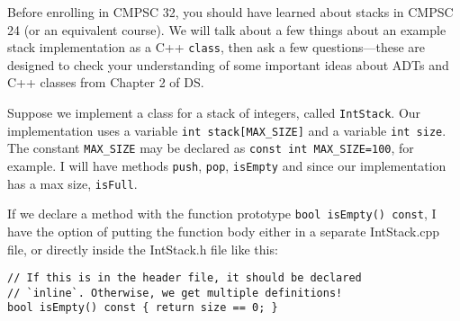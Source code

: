 \documentclass[11pt]{article}
\begin{document}
Before enrolling in CMPSC 32, you should have learned about stacks
in CMPSC 24 (or an equivalent course). We will talk about a few
things about an example stack implementation as a C++ \texttt{class}, then
ask a few questions---these are designed to check your understanding
of some important ideas about ADTs and C++ classes from Chapter 2 of
DS.

Suppose we implement a class for a stack of integers, called
\texttt{IntStack}.  Our implementation uses a variable \texttt{int
  stack[MAX\_SIZE]} and a variable \texttt{int size}. The constant \texttt{MAX\_SIZE}
may be declared as \texttt{const int MAX\_SIZE=100}, for example. I will
have methods \texttt{push}, \texttt{pop}, \texttt{isEmpty} and since our implementation
has a max size, \texttt{isFull}.

If we declare a method with the function prototype \texttt{bool isEmpty() const},
I have the option of putting the function body either in a separate
IntStack.cpp file, or directly inside the IntStack.h file like this:

\begin{verbatim}
// If this is in the header file, it should be declared
// `inline`. Otherwise, we get multiple definitions!
bool isEmpty() const { return size == 0; }
\end{verbatim}
\end{document}
